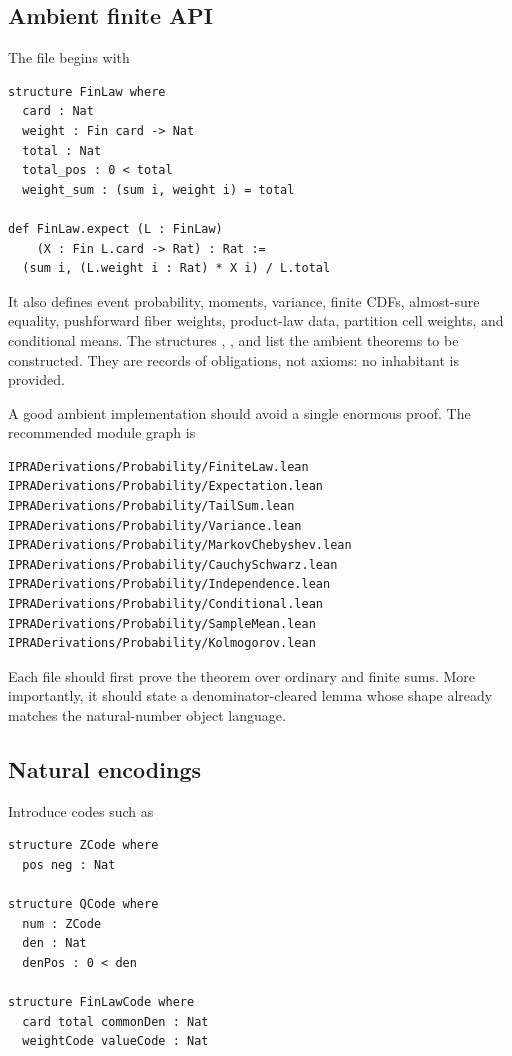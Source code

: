 \subsection{Ambient finite API}

The file  begins with

\begin{lstlisting}[language={}]
structure FinLaw where
  card : Nat
  weight : Fin card -> Nat
  total : Nat
  total_pos : 0 < total
  weight_sum : (sum i, weight i) = total

def FinLaw.expect (L : FinLaw)
    (X : Fin L.card -> Rat) : Rat :=
  (sum i, (L.weight i : Rat) * X i) / L.total
\end{lstlisting}

It also defines event probability, moments, variance, finite CDFs, almost-sure
equality, pushforward fiber weights, product-law data, partition cell weights,
and conditional means.  The structures
,
, and  list the
ambient theorems to be constructed.  They are records of obligations, not
axioms: no inhabitant is provided.

A good ambient implementation should avoid a single enormous proof.  The
recommended module graph is

\begin{verbatim}
IPRADerivations/Probability/FiniteLaw.lean
IPRADerivations/Probability/Expectation.lean
IPRADerivations/Probability/TailSum.lean
IPRADerivations/Probability/Variance.lean
IPRADerivations/Probability/MarkovChebyshev.lean
IPRADerivations/Probability/CauchySchwarz.lean
IPRADerivations/Probability/Independence.lean
IPRADerivations/Probability/Conditional.lean
IPRADerivations/Probability/SampleMean.lean
IPRADerivations/Probability/Kolmogorov.lean
\end{verbatim}

Each file should first prove the theorem over ordinary  and finite
sums.  More importantly, it should state a denominator-cleared lemma whose
shape already matches the natural-number object language.

\subsection{Natural encodings}

Introduce codes such as

\begin{lstlisting}[language={}]
structure ZCode where
  pos neg : Nat

structure QCode where
  num : ZCode
  den : Nat
  denPos : 0 < den

structure FinLawCode where
  card total commonDen : Nat
  weightCode valueCode : Nat
\end{lstlisting}

